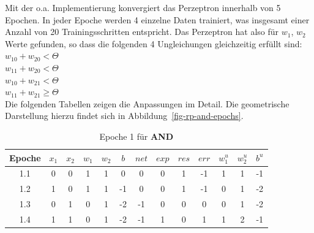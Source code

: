 \noindent
Mit der o.a. Implementierung konvergiert das Perzeptron innerhalb von 5 Epochen.
In jeder Epoche werden 4 einzelne Daten trainiert, was insgesamt einer Anzahl von 20 Trainingsschritten entspricht.
Das Perzeptron hat also für $w_1$, $w_2$ Werte gefunden, so dass die folgenden 4 Ungleichungen gleichzeitig erfüllt sind:\\



$w_10 + w_20 < \Theta$\\

$w_11 + w_20 < \Theta$\\

$w_10 + w_21 < \Theta$\\

$w_11 + w_21 \geq \Theta$\\



Die folgenden Tabellen zeigen die Anpassungen im Detail. 
Die geometrische Darstellung hierzu findet sich in Abbildung~\ref{fig-rp-and-epochs}.

\setlength{\tabcolsep}{0.8em}
\begin{table} %
    \centering
    \begin{tabular}{c | c | c | c | c | c | c | c | c | c | c | c | c}
        Epoche & $x_1$ & $x_2$ & $w_1$ & $w_2$ & $b$ & $net$ & $exp$ & $res$ & $err$ & $w^u_1$ & $w^u_2$ & $b^u$ \\
        \hline
        1.1& 0     & 0     & 1     & 1     & 0   & 0     & 0     & 1     & -1  & 1       & 1       & -1 \\
        1.2& 1     & 0     & 1     & 1     & -1  & 0     & 0     & 1     & -1  & 0       & 1       & -2 \\
        1.3& 0     & 1     & 0     & 1     & -2  & -1    & 0     & 0     & 0   & 0       & 1       & -2 \\
        1.4& 1     & 1     & 0     & 1     & -2  & -1    & 1     & 0     & 1   & 1       & 2       & -1 \\
    \end{tabular}
    \caption{Epoche 1 für \textbf{AND}}
    \label{tab:mcp-andep1}
\end{table}

